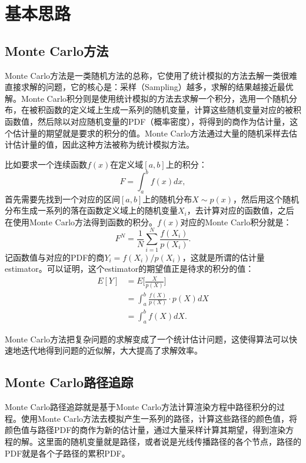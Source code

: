 \documentclass[10pt,a4paper]{article}
\begin{document}
\pagestyle{myheadings}
\markright{\articletitle}
\thispagestyle{plain}
\printtitle

\tableofcontents

\newpage
\section{基本思路}
\subsection{Monte Carlo方法}
Monte Carlo方法是一类随机方法的总称，它使用了统计模拟的方法去解一类很难直接求解的问题，它的核心是：采样（Sampling）越多，求解的结果越接近最优解。Monte Carlo积分则是使用统计模拟的方法去求解一个积分，选用一个随机分布，在被积函数的定义域上生成一系列的随机变量，计算这些随机变量对应的被积函数值，然后除以对应随机变量的PDF（概率密度），将得到的商作为估计量，这个估计量的期望就是要求的积分的值。Monte Carlo方法通过大量的随机采样去估计估计量的值，因此这种方法被称为统计模拟方法。

比如要求一个连续函数$f(x)$在定义域$[a, b]$上的积分：
\begin{equation}
  F = \int_a^b f(x) dx,
\end{equation}
首先需要先找到一个对应的区间$[a, b]$上的随机分布$X \sim p(x)$，然后用这个随机分布生成一系列的落在函数定义域上的随机变量$X_i$，去计算对应的函数值，之后在使用Monte Carlo方法得到函数的积分。$f(x)$对应的Monte Carlo积分就是：
\begin{equation}
  F^N = \frac{1}{N} \sum_{i=1}^N \frac{f(X_i)}{p(X_i)}.
\end{equation}
记函数值与对应的PDF的商$Y_i = f(X_i) / p(X_i)$，这就是所谓的估计量estimator。可以证明，这个estimator的期望值正是待求的积分的值：
\begin{equation}
\begin{split}
  E[Y] &= E \Big[ \frac{X}{p(X)} \Big] \\
       &= \int_a^b \frac{f(X)}{p(X)} \cdot p(X) dX \\
       &= \int_a^b f(X)dX.
\end{split}
\end{equation}

Monte Carlo方法把复杂问题的求解变成了一个统计估计问题，这使得算法可以快速地迭代地得到问题的近似解，大大提高了求解效率。

\subsection{Monte Carlo路径追踪}
Monte Carlo路径追踪就是基于Monte Carlo方法计算渲染方程中路径积分的过程。使用Monte Carlo方法去模拟产生一系列的路径，计算这些路径的颜色值，将颜色值与路径PDF的商作为新的估计量，通过大量采样计算其期望，得到渲染方程的解。这里面的随机变量就是路径，或者说是光线传播路径的各个节点，路径的PDF就是各个子路径的累积PDF。
\end{document}
